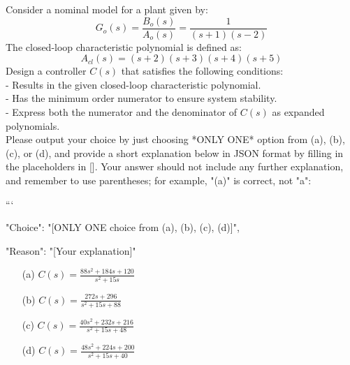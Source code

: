 \documentclass[12pt]{article}
\begin{document}
Consider a nominal model for a plant given by:
\begin{equation}
G_o(s) = \frac{B_o(s)}{A_o(s)}=\frac{1}{(s + 1)(s - 2)}
\end{equation}
The closed-loop characteristic polynomial is defined as:
\begin{equation}
A_{cl}(s) = (s + 2)(s + 3)(s + 4)(s + 5)
\end{equation}
Design a controller \(C(s)\) that satisfies the following conditions:\\
- Results in the given closed-loop characteristic polynomial.\\
- Has the minimum order numerator to ensure system stability.\\
- Express both the numerator and the denominator of \(C(s)\) as expanded polynomials.\\

Please output your choice by just choosing *ONLY ONE* option from (a), (b), (c), or (d), and provide a short explanation below in JSON format by filling in the placeholders in []. Your answer should not include any further explanation, and remember to use parentheses; for example, "(a)" is correct, not "a":

```
{

"Choice": "[ONLY ONE choice from (a), (b), (c), (d)]",

"Reason": "[Your explanation]"

}

\begin{itemize}
    \item[(a)] \(C(s) = \frac{88s^2+184s+120}{s^2+15s}\)
    \item[(b)] \(C(s) = \frac{272s+296}{s^2+15s+88}\)
    \item[(c)] \(C(s) = \frac{40s^2+232s+216}{s^2+15s+48}\)
    \item[(d)] \(C(s) = \frac{48s^2+224s+200}{s^2+15s+40}\)
\end{itemize}
\end{document}
